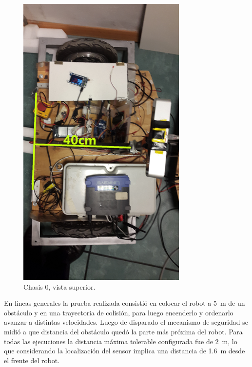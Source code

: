 \documentclass[withindex,glossary]{cam-thesis}
\begin{document}
\begin{figure}[H]
\begin{minipage}[b]{0.4\textwidth}
    \includegraphics[width=\textwidth]{images/Chasis0_TOP}
    \caption[Chasis 0 - Vista Superior]{Chasis 0, vista superior.}
    \label{fig:vistaSuperior}
  \end{minipage}
\end{figure}

En líneas generales la prueba realizada consistió en colocar el robot a \SI{5}{\metre} de un obstáculo y en una trayectoria de colisión, para luego encenderlo y ordenarlo avanzar a distintas velocidades. Luego de disparado el mecanismo de seguridad se midió a que distancia del obstáculo quedó la parte más próxima del robot. Para todas las ejecuciones la distancia máxima tolerable configurada fue de \SI{2}{\metre}, lo que considerando la localización del sensor implica una distancia de \SI{1.6}{\metre} desde el frente del robot.
\end{document}
